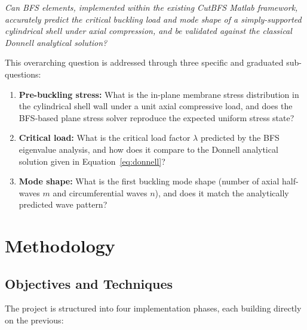 \documentclass[9pt,a4paper,twoside]{tau-class/tau}
\begin{document}
\begin{tcolorbox}[colback=gray!10, colframe=gray!50, rounded corners]
\textit{Can BFS elements, implemented within the existing CutBFS Matlab
framework, accurately predict the critical buckling load and mode shape of a
simply-supported cylindrical shell under axial compression, and be validated
against the classical Donnell analytical solution?}
\end{tcolorbox}

\noindent This overarching question is addressed through three specific and
graduated sub-questions:

\begin{enumerate}
    \item \textbf{Pre-buckling stress:} What is the in-plane membrane stress
    distribution in the cylindrical shell wall under a unit axial compressive
    load, and does the BFS-based plane stress solver reproduce the expected
    uniform stress state?

    \item \textbf{Critical load:} What is the critical load factor $\lambda$
    predicted by the BFS eigenvalue analysis, and how does it compare to the
    Donnell analytical solution given in Equation~\eqref{eq:donnell}?

    \item \textbf{Mode shape:} What is the first buckling mode shape (number
    of axial half-waves $m$ and circumferential waves $n$), and does it match
    the analytically predicted wave pattern?
\end{enumerate}

\section{Methodology}

\subsection{Objectives and Techniques}

The project is structured into four implementation phases, each building
directly on the previous:
\end{document}

